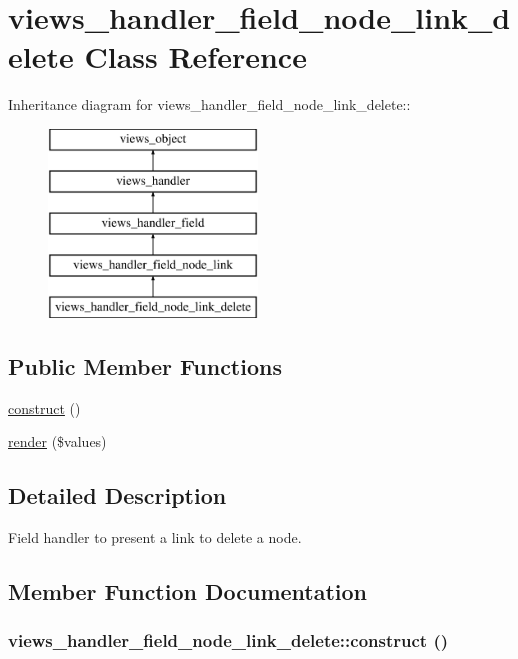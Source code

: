 \hypertarget{classviews__handler__field__node__link__delete}{
\section{views\_\-handler\_\-field\_\-node\_\-link\_\-delete Class Reference}
\label{classviews__handler__field__node__link__delete}
}
Inheritance diagram for views\_\-handler\_\-field\_\-node\_\-link\_\-delete::\begin{figure}[H]
\begin{center}
\leavevmode
\includegraphics[height=5cm]{classviews__handler__field__node__link__delete}
\end{center}
\end{figure}
\subsection*{Public Member Functions}
\begin{CompactItemize}
\item 
\hyperlink{classviews__handler__field__node__link__delete_e00ce6a645c0545eec54fac96a3a5cf9}{construct} ()
\item 
\hyperlink{classviews__handler__field__node__link__delete_f0b922dd3c019c53247d0c30c83cfc99}{render} (\$values)
\end{CompactItemize}


\subsection{Detailed Description}
Field handler to present a link to delete a node. 

\subsection{Member Function Documentation}
\hypertarget{classviews__handler__field__node__link__delete_e00ce6a645c0545eec54fac96a3a5cf9}{
\subsubsection[{construct}]{\setlength{\rightskip}{0pt plus 5cm}views\_\-handler\_\-field\_\-node\_\-link\_\-delete::construct ()}}
\label{classviews__handler__field__node__link__delete_e00ce6a645c0545eec54fac96a3a5cf9}


